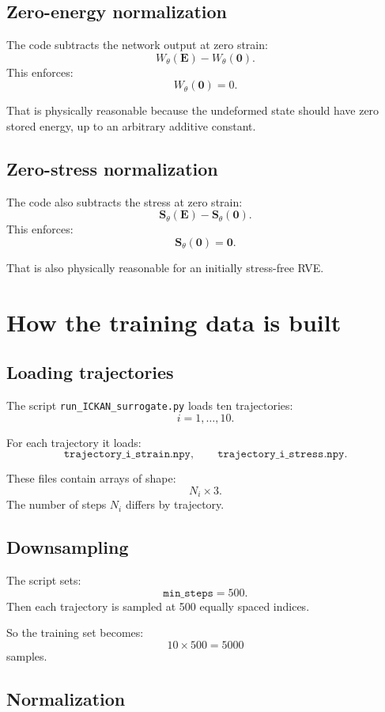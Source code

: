 \documentclass[11pt]{article}
\newcommand{\E}{\bm{E}}
\newcommand{\Sstress}{\bm{S}}
\begin{document}
\subsection{Zero-energy normalization}

The code subtracts the network output at zero strain:
\[
  W_{\theta}(\E) - W_{\theta}(\bm{0}).
\]
This enforces:
\[
  W_{\theta}(\bm{0})=0.
\]

That is physically reasonable because the undeformed state should have zero
stored energy, up to an arbitrary additive constant.

\subsection{Zero-stress normalization}

The code also subtracts the stress at zero strain:
\[
  \Sstress_{\theta}(\E) - \Sstress_{\theta}(\bm{0}).
\]
This enforces:
\[
  \Sstress_{\theta}(\bm{0})=\bm{0}.
\]

That is also physically reasonable for an initially stress-free RVE.

\section{How the training data is built}

\subsection{Loading trajectories}

The script \texttt{run\_ICKAN\_surrogate.py} loads ten trajectories:
\[
  i=1,\dots,10.
\]

For each trajectory it loads:
\[
  \texttt{trajectory\_i\_strain.npy},
  \qquad
  \texttt{trajectory\_i\_stress.npy}.
\]

These files contain arrays of shape:
\[
  N_i \times 3.
\]
The number of steps $N_i$ differs by trajectory.

\subsection{Downsampling}

The script sets:
\[
  \texttt{min\_steps}=500.
\]
Then each trajectory is sampled at 500 equally spaced indices.

So the training set becomes:
\[
  10 \times 500 = 5000
\]
samples.

\subsection{Normalization}
\end{document}
